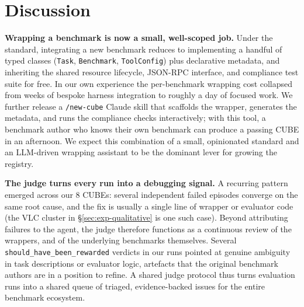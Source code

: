 \documentclass{article}
\newcommand{\NUMEXP}{8}               %
\newcommand{\mypar}[1]{\par\noindent\textbf{#1}\enspace}
\begin{document}
\section{Discussion}
\label{sec:discussion}

\mypar{Wrapping a benchmark is now a small, well-scoped job.}
Under the standard, integrating a new benchmark reduces to implementing
a handful of typed classes (\texttt{Task}, \texttt{Benchmark},
\texttt{ToolConfig}) plus declarative metadata, and inheriting the
shared resource lifecycle, JSON-RPC interface, and compliance test
suite for free. In our own experience the per-benchmark wrapping cost
collapsed from weeks of bespoke harness integration to roughly a day of
focused work. We further release a \texttt{/new-cube} Claude skill that
scaffolds the wrapper, generates the metadata, and runs the compliance
checks interactively; with this tool, a benchmark author who knows their
own benchmark can produce a passing CUBE in an afternoon. We expect this
combination of a small, opinionated standard and an LLM-driven
wrapping assistant to be the dominant lever for growing the registry.

\mypar{The judge turns every run into a debugging signal.}
A recurring pattern emerged across our \NUMEXP{} CUBEs: several
independent failed episodes converge on the same root cause, and the
fix is usually a single line of wrapper or evaluator code (the VLC
cluster in \S\ref{sec:exp-qualitative} is one such case). Beyond
attributing failures to the agent, the judge therefore functions as a
continuous review of the wrappers, and of the underlying benchmarks
themselves. Several \texttt{should\_have\_been\_rewarded} verdicts in
our runs pointed at genuine ambiguity in task descriptions or
evaluator logic, artefacts that the original benchmark authors are in
a position to refine. A shared judge protocol thus turns evaluation
runs into a shared queue of triaged, evidence-backed issues for the
entire benchmark ecosystem.
\end{document}

